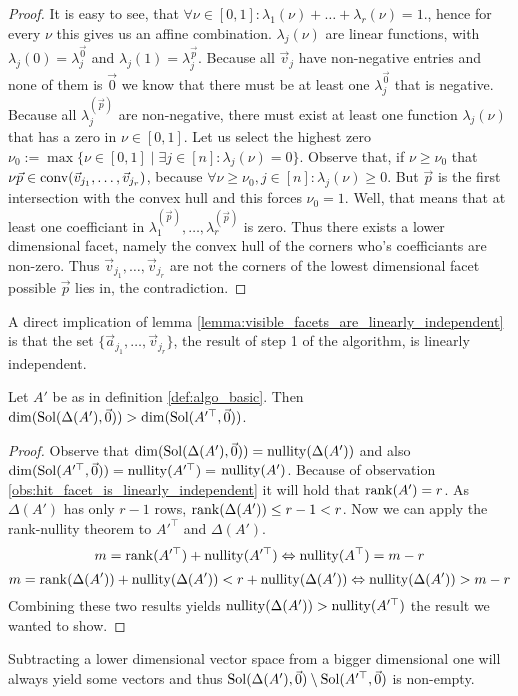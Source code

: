 \begin{proof}
    It is easy to see, that $\forall \nu\in[0, 1]: \lambda_1(\nu) + \dots + \lambda_r(\nu) = 1$., hence for every $\nu$ this gives us an affine combination. $\lambda_j(\nu)$ are linear functions, with $\lambda_j(0) = \lambda_j^{\vec 0}$ and $\lambda_j(1) = \lambda_j^{\vec p}$. Because all $\vec v_j$ have non-negative entries and none of them is $\vec 0$ we know that there must be at least one $\lambda_j^{\vec 0}$ that is negative. Because all $\lambda_j^{(\vec p)}$ are non-negative, there must exist at least one function $\lambda_j(\nu)$ that has a zero in $\nu \in [0, 1]$. Let us select the highest zero $\nu_0 := \max\{\nu \in [0, 1]\mid \exists j\in [n]\colon \lambda_j(\nu) = 0\}$. Observe that, if $\nu \geq \nu_0$ that $\nu\vec p \in \operatorname{conv}(\vec v_{j_1}, \dots, \vec v_{j_r})$, because $\forall \nu \geq \nu_0, j\in[n]\colon \lambda_j(\nu) \geq 0$. But $\vec p$ is the first intersection with the convex hull and this forces $\nu_0 = 1$. Well, that means that at least one coefficiant in $\lambda^{(\vec p)}_1, \dots, \lambda^{(\vec p)}_r$ is zero. Thus there exists a lower dimensional facet, namely the convex hull of the corners who's coefficiants are non-zero. Thus $\vec v_{j_1}, \dots, \vec v_{j_r}$ are not the corners of the lowest dimensional facet possible $\vec p$ lies in, the contradiction.
\end{proof}

\begin{observation}
    \label{obs:hit_facet_is_linearly_independent}
    A direct implication of lemma \ref{lemma:visible_facets_are_linearly_independent} is that the set $\{\vec a_{j_1}, \dots, \vec v_{j_r}\}$, the result of step 1 of the algorithm, is linearly independent.  
\end{observation}

\begin{lemma}
    \label{lemma:solspace_big_enough}
    Let $A'$ be as in definition \ref{def:algo_basic}. Then $\dim(\operatorname{Sol}(\Delta(A'), \vec0)) > \dim(\operatorname{Sol}(A'^\top, \vec0))$.
\end{lemma}
\begin{proof}
    Observe that $\dim(\operatorname{Sol}(\Delta(A'), \vec0)) = \operatorname{nullity}(\Delta(A'))$ and also $\dim(\operatorname{Sol}(A'^\top, \vec0)) = \operatorname{nullity}(A'^\top) =$ $\operatorname{nullity}(A')$. Because of observation \ref{obs:hit_facet_is_linearly_independent} it will hold that $\operatorname{rank}(A') = r$. As $\Delta(A')$ has only $r-1$ rows, $\operatorname{rank}(\Delta(A')) \leq r-1 < r$. Now we can apply the rank-nullity theorem to $A'^\top$ and $\Delta(A')$.
    $$m = \operatorname{rank}(A'^\top) + \operatorname{nullity}(A'^\top) \Leftrightarrow \operatorname{nullity}(A^\top) = m - r$$
    $$m = \operatorname{rank}(\Delta(A')) + \operatorname{nullity}(\Delta(A')) < r + \operatorname{nullity}(\Delta(A'))\Leftrightarrow \operatorname{nullity}(\Delta(A')) > m - r$$
    Combining these two results yields $\operatorname{nullity}(\Delta(A')) > \operatorname{nullity}(A'^\top)$ the result we wanted to show.
\end{proof}
Subtracting a lower dimensional vector space from a bigger dimensional one will always yield some vectors and thus $\operatorname{Sol}(\Delta(A'), \vec0) \setminus \operatorname{Sol}(A'^\top, \vec0)$ is non-empty.

